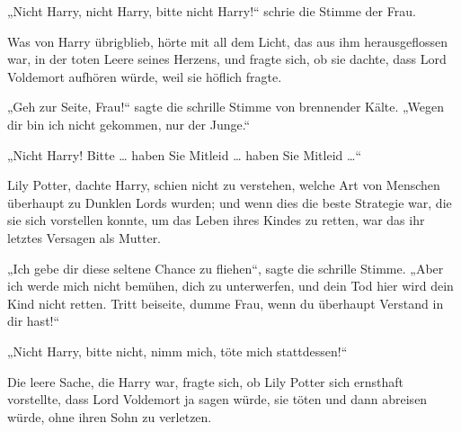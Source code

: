 \begin{em}
„Nicht Harry, nicht Harry, bitte nicht Harry!“ schrie die Stimme der Frau.

Was von Harry übrigblieb, hörte mit all dem Licht, das aus ihm herausgeflossen war, in der toten Leere seines Herzens, und fragte sich, ob sie dachte, dass Lord Voldemort aufhören würde, weil sie höflich fragte.

„Geh zur Seite, Frau!“ sagte die schrille Stimme von brennender Kälte.
„Wegen dir bin ich nicht gekommen, nur der Junge.“

„Nicht Harry! Bitte … haben Sie Mitleid … haben Sie Mitleid …“

Lily Potter, dachte Harry, schien nicht zu verstehen, welche Art von Menschen überhaupt zu Dunklen Lords wurden; und wenn dies die beste Strategie war, die sie sich vorstellen konnte, um das Leben ihres Kindes zu retten, war das ihr letztes Versagen als Mutter.

„Ich gebe dir diese seltene Chance zu fliehen“, sagte die schrille Stimme.
„Aber ich werde mich nicht bemühen, dich zu unterwerfen, und dein Tod hier wird dein Kind nicht retten. Tritt beiseite, dumme Frau, wenn du überhaupt Verstand in dir hast!“

„Nicht Harry, bitte nicht, nimm mich, töte mich stattdessen!“

Die leere Sache, die Harry war, fragte sich, ob Lily Potter sich ernsthaft vorstellte, dass Lord Voldemort ja sagen würde, sie töten und dann abreisen würde, ohne ihren Sohn zu verletzen.


\end{em}
